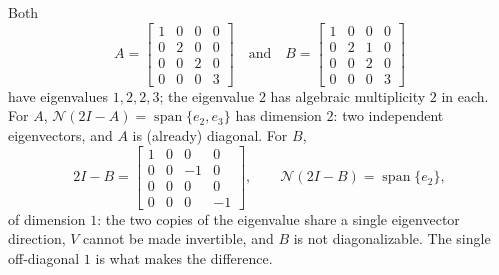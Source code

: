 \documentclass[11pt]{article}
\begin{document}
\begin{example}
Both
\[
   A=\begin{bmatrix}1&0&0&0\\0&2&0&0\\0&0&2&0\\0&0&0&3\end{bmatrix}
   \quad\text{and}\quad
   B=\begin{bmatrix}1&0&0&0\\0&2&1&0\\0&0&2&0\\0&0&0&3\end{bmatrix}
\]
have eigenvalues $1,2,2,3$; the eigenvalue $2$ has algebraic multiplicity $2$ in
each. For $A$, $\mathcal N(2I-A)=\operatorname{span}\{e_2,e_3\}$ has dimension $2$:
two independent eigenvectors, and $A$ is (already) diagonal. For $B$,
\[
   2I-B=\begin{bmatrix}1&0&0&0\\0&0&-1&0\\0&0&0&0\\0&0&0&-1\end{bmatrix},
   \qquad \mathcal N(2I-B)=\operatorname{span}\{e_2\},
\]
of dimension $1$: the two copies of the eigenvalue share a single eigenvector
direction, $V$ cannot be made invertible, and $B$ is not diagonalizable. The single
off-diagonal $1$ is what makes the difference.
\end{example}
\end{document}
